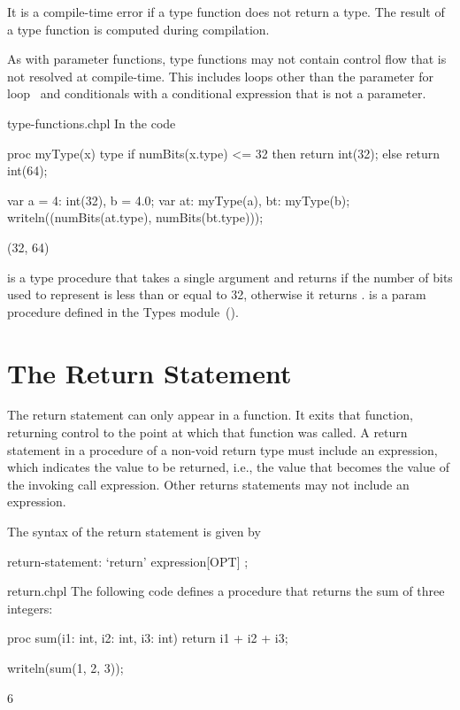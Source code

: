 It is a compile-time error if a type function does not return a type.
The result of a type function is computed during compilation.

As with parameter functions, type functions may not contain control
flow that is not resolved at compile-time.  This includes loops other
than the parameter for loop~ and
conditionals with a conditional expression that is not a parameter.

\begin{chapelexample}{type-functions.chpl}
In the code
\begin{chapel}
proc myType(x) type {
  if numBits(x.type) <= 32 then return int(32);
  else return int(64);
}
\end{chapel}
\begin{chapelpost}
var a = 4: int(32),
    b = 4.0;
var at: myType(a),
    bt: myType(b);
writeln((numBits(at.type), numBits(bt.type)));
\end{chapelpost}
\begin{chapeloutput}
(32, 64)
\end{chapeloutput}
 is a type procedure that takes a single
argument  and returns  if the number of bits used to
represent  is less than or equal to 32, otherwise it
returns .   is a param
procedure defined in the Types module~().
\end{chapelexample}


\section{The Return Statement}
\label{The_Return_Statement}

The return statement can only appear in a function.  It exits that
function, returning control to the point at which that function was
called.  A return statement in a procedure of a non-void return type
must include an expression, which indicates the value to be returned,
i.e., the value that becomes the value of the invoking call expression.
Other returns statements may not include an expression.

The syntax of the return statement is given by
\begin{syntax}
return-statement:
  `return' expression[OPT] ;
\end{syntax}

\begin{chapelexample}{return.chpl}
The following code defines a procedure that returns the sum of three
integers:
\begin{chapel}
proc sum(i1: int, i2: int, i3: int)
  return i1 + i2 + i3;
\end{chapel}
\begin{chapelpost}
writeln(sum(1, 2, 3));
\end{chapelpost}
\begin{chapeloutput}
6
\end{chapeloutput}
\end{chapelexample}


